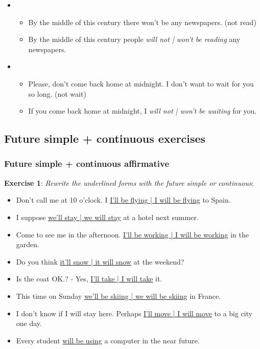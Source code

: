 \begin{itemize}
\item
\begin{itemize}
\item By the middle of this century there won't be any newspapers. (not read)
\item By the middle of this century people \textit{will not | won't be reading} any newspapers.
\end{itemize}

\item
\begin{itemize}
\item Please, don't come back home at midnight. I don't want to wait for you so long. (not wait)
\item If you come back home at midnight, I \textit{will not | won't be waiting} for you.
\end{itemize}

\end{itemize}


\subsection{Future simple + continuous exercises}

\subsubsection{Future simple + continuous affirmative}

\textbf{Exercise 1}: \textit{Rewrite the underlined forms with the future simple or continuous}:

\begin{itemize}

\item Don't call me at 10 o'clock. I \underline{I'll be flying | I will be flying} to Spain.
\item I suppose \underline{we'll stay | we will stay} at a hotel next summer.
\item Come to see me in the afternoon. \underline{I'll be working | I will be working} in the garden.
\item Do you think \underline{it'll snow | it will snow} at the weekend?
\item Is the coat OK.? - Yes, \underline{I'll take | I will take} it.
\item This time on Sunday \underline{we'll be skiing | we will be skiing} in France.
\item I don't know if I will stay here. Perhaps \underline{I'll move | I will move} to a big city one day.
\item Every student \underline{will be using} a computer in the near future.

\end{itemize}

